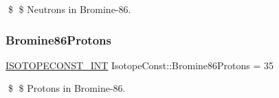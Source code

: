 \$ \$ Neutrons in Bromine-\/86. \mbox{\label{group___isotope_const-_bromine-_br86_ga6bf875a742fc88a09f3f350b8414d306}} 
\subsubsection{\texorpdfstring{Bromine86\+Protons}{Bromine86Protons}}
{\footnotesize\ttfamily \mbox{\hyperlink{group___isotope_const-_macros_ga5f18360b3e99483a35c32d789e62621c}{I\+S\+O\+T\+O\+P\+E\+C\+O\+N\+S\+T\+\_\+\+I\+NT}} Isotope\+Const\+::\+Bromine86\+Protons = 35}

\$ \$ Protons in Bromine-\/86. 